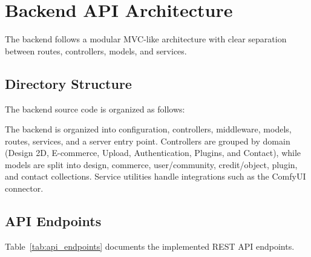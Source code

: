 \section{Backend API Architecture}
\label{sec:backend_api}

The backend follows a modular MVC-like architecture with clear separation between routes, controllers, models, and services.

\subsection{Directory Structure}

The backend source code is organized as follows:

The backend is organized into configuration, controllers, middleware, models, routes, services, and a server entry point. Controllers are grouped by domain (Design 2D, E-commerce, Upload, Authentication, Plugins, and Contact), while models are split into design, commerce, user/community, credit/object, plugin, and contact collections. Service utilities handle integrations such as the ComfyUI connector.

\subsection{API Endpoints}

Table~\ref{tab:api_endpoints} documents the implemented REST API endpoints.

